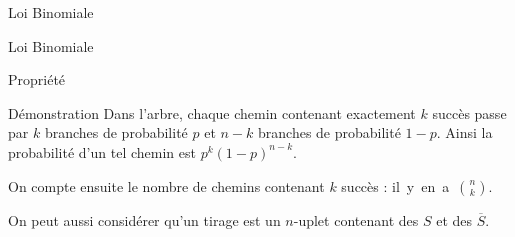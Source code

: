 \documentclass{coursbook}
\begin{document}
\begin{Gpartie}{Loi Binomiale}
\begin{Spartie}{Loi Binomiale}
\begin{SSpartie}{Propriété}
\begin{center}
                        \parbox{\linewidth}{}
                \end{center}
                \vfill
                \pagebreak
                \begin{SSSpartie}{Démonstration} 
                    Dans l'arbre, chaque chemin contenant exactement $k$ succès passe par $k$ branches de probabilité $p$ et $n-k$ branches de probabilité $1-p$. Ainsi la probabilité d'un tel chemin est $p^k(1-p)^{n-k}$.

                    On compte ensuite le nombre de chemins contenant $k$ succès : il~y~en~a~$\binom{n}{k}$.

                    On peut aussi considérer qu'un tirage est un $n$-uplet contenant des $S$ et des $\overline{S}$.


\end{SSSpartie}
\end{SSpartie}
\end{Spartie}
\end{Gpartie}
\end{document}
